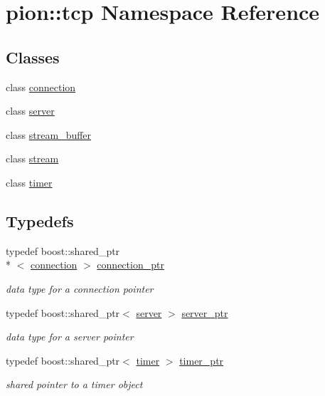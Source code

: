 \hypertarget{namespacepion_1_1tcp}{\section{pion\-:\-:tcp Namespace Reference}
\label{namespacepion_1_1tcp}
}
\subsection*{Classes}
\begin{DoxyCompactItemize}
\item 
class \hyperlink{classpion_1_1tcp_1_1connection}{connection}
\item 
class \hyperlink{classpion_1_1tcp_1_1server}{server}
\item 
class \hyperlink{classpion_1_1tcp_1_1stream__buffer}{stream\-\_\-buffer}
\item 
class \hyperlink{classpion_1_1tcp_1_1stream}{stream}
\item 
class \hyperlink{classpion_1_1tcp_1_1timer}{timer}
\end{DoxyCompactItemize}
\subsection*{Typedefs}
\begin{DoxyCompactItemize}
\item 
typedef boost\-::shared\-\_\-ptr\\*
$<$ \hyperlink{classpion_1_1tcp_1_1connection}{connection} $>$ \hyperlink{namespacepion_1_1tcp_a6c9b7497068009f6d81d95ec0b0627d6}{connection\-\_\-ptr}
\begin{DoxyCompactList}\small\item\em data type for a connection pointer \end{DoxyCompactList}\item 
typedef boost\-::shared\-\_\-ptr$<$ \hyperlink{classpion_1_1tcp_1_1server}{server} $>$ \hyperlink{namespacepion_1_1tcp_abdb69244f6c6f16c8c5f9b759819df8f}{server\-\_\-ptr}
\begin{DoxyCompactList}\small\item\em data type for a server pointer \end{DoxyCompactList}\item 
typedef boost\-::shared\-\_\-ptr$<$ \hyperlink{classpion_1_1tcp_1_1timer}{timer} $>$ \hyperlink{namespacepion_1_1tcp_a5f0d9ecf54fb010fab5847b8e4519847}{timer\-\_\-ptr}
\begin{DoxyCompactList}\small\item\em shared pointer to a timer object \end{DoxyCompactList}\end{DoxyCompactItemize}


